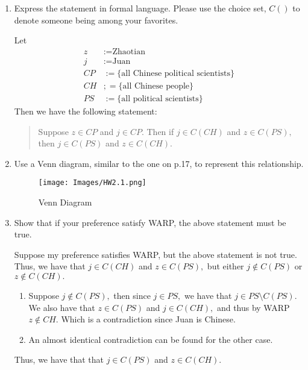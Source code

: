 \documentclass[11pt]{article}
\newcommand{\sm}{\setminus}
\begin{document}
\begin{enumerate}
    \item 
    \begin{problem}
        Express the statement in formal language. Please use the choice set, $C()$ to denote someone being among your favorites.
    \end{problem}
    \begin{solution}
        Let 
        \begin{align*}
            z &:= \text{Zhaotian}\\
            j &:= \text{Juan}\\
            CP &:= \{\text{all Chinese political scientists}\}\\
            CH &;= \{\text{all Chinese people}\}\\
            PS &:= \{\text{all political scientists}\}
        \end{align*}
        Then we have the following statement:
        \begin{quote}
            Suppose $z\in CP$ and $j \in CP.$ Then if $j\in C(CH)$ and $z \in C(PS),$ then $j\in C(PS)$ and $z\in C(CH).$
        \end{quote}
    \end{solution}
    \item 
    \begin{problem}
        Use a Venn diagram, similar to the one on p.17, to represent this relationship.
    \end{problem}
    \begin{figure}[h!]
        \centering
        \texttt{[image: Images/HW2.1.png]}
        \caption{Venn Diagram}
    \end{figure}

    \item 
    \begin{problem}
        Show that if your preference satisfy WARP, the above statement must be true.
    \end{problem}
    \begin{solution}
        Suppose my preference satisfies WARP, but the above statement is not true. Thus, we have that $j \in C(CH)$ and $z\in C(PS),$ but either $j \notin C(PS)$ or $z \notin C(CH).$
        \begin{enumerate}
            \item Suppose $j\notin C(PS),$ then since $j \in PS,$ we have that $j \in PS\sm C(PS).$ We also have that $z \in C(PS)$ and $j \in C(CH),$ and thus by WARP $z\notin CH.$ Which is a contradiction since Juan is Chinese.
            \item An almost identical contradiction can be found for the other case.
        \end{enumerate}
        Thus, we have that that $j \in C(PS)$ and $z\in C(CH).$
    \end{solution}
\end{enumerate}
\end{document}
